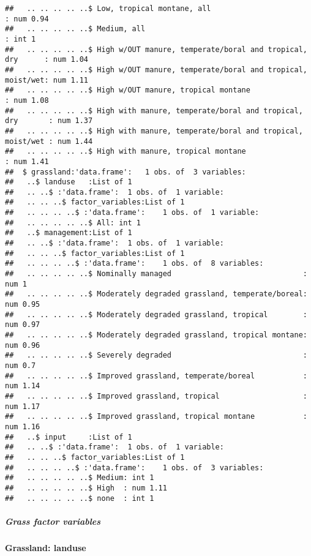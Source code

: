 \documentclass[
]{article}
\newenvironment{Shaded}{\begin{snugshade}}{\end{snugshade}}
\newcommand{\AttributeTok}[1]{\textcolor[rgb]{0.77,0.63,0.00}{#1}}
\newcommand{\DecValTok}[1]{\textcolor[rgb]{0.00,0.00,0.81}{#1}}
\newcommand{\FunctionTok}[1]{\textcolor[rgb]{0.00,0.00,0.00}{#1}}
\newcommand{\NormalTok}[1]{#1}
\newcommand{\OtherTok}[1]{\textcolor[rgb]{0.56,0.35,0.01}{#1}}
\newcommand{\SpecialCharTok}[1]{\textcolor[rgb]{0.00,0.00,0.00}{#1}}
\begin{document}
\begin{verbatim}
##   .. .. .. .. ..$ Low, tropical montane, all                                : num 0.94
##   .. .. .. .. ..$ Medium, all                                               : int 1
##   .. .. .. .. ..$ High w/OUT manure, temperate/boral and tropical, dry      : num 1.04
##   .. .. .. .. ..$ High w/OUT manure, temperate/boral and tropical, moist/wet: num 1.11
##   .. .. .. .. ..$ High w/OUT manure, tropical montane                       : num 1.08
##   .. .. .. .. ..$ High with manure, temperate/boral and tropical, dry       : num 1.37
##   .. .. .. .. ..$ High with manure, temperate/boral and tropical, moist/wet : num 1.44
##   .. .. .. .. ..$ High with manure, tropical montane                        : num 1.41
##  $ grassland:'data.frame':   1 obs. of  3 variables:
##   ..$ landuse   :List of 1
##   .. ..$ :'data.frame':  1 obs. of  1 variable:
##   .. .. ..$ factor_variables:List of 1
##   .. .. .. ..$ :'data.frame':    1 obs. of  1 variable:
##   .. .. .. .. ..$ All: int 1
##   ..$ management:List of 1
##   .. ..$ :'data.frame':  1 obs. of  1 variable:
##   .. .. ..$ factor_variables:List of 1
##   .. .. .. ..$ :'data.frame':    1 obs. of  8 variables:
##   .. .. .. .. ..$ Nominally managed                              : num 1
##   .. .. .. .. ..$ Moderately degraded grassland, temperate/boreal: num 0.95
##   .. .. .. .. ..$ Moderately degraded grassland, tropical        : num 0.97
##   .. .. .. .. ..$ Moderately degraded grassland, tropical montane: num 0.96
##   .. .. .. .. ..$ Severely degraded                              : num 0.7
##   .. .. .. .. ..$ Improved grassland, temperate/boreal           : num 1.14
##   .. .. .. .. ..$ Improved grassland, tropical                   : num 1.17
##   .. .. .. .. ..$ Improved grassland, tropical montane           : num 1.16
##   ..$ input     :List of 1
##   .. ..$ :'data.frame':  1 obs. of  1 variable:
##   .. .. ..$ factor_variables:List of 1
##   .. .. .. ..$ :'data.frame':    1 obs. of  3 variables:
##   .. .. .. .. ..$ Medium: int 1
##   .. .. .. .. ..$ High  : num 1.11
##   .. .. .. .. ..$ none  : int 1
\end{verbatim}

\hypertarget{grass-factor-variables}{%
\subparagraph{Grass factor variables}\label{grass-factor-variables}}

\textbf{Grassland: landuse}

\begin{Shaded}
\end{Shaded}
\end{document}
